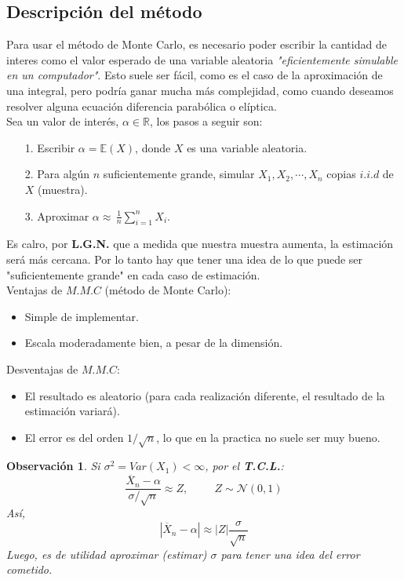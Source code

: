 \documentclass[a4paper]{article}
\numberwithin{equation}{subsection}
\newtheorem{obs}{Observación}
\def\R{\mathbb R}
\def\E{\mathbb E}
\begin{document}
\subsection{Descripción del método}
Para usar el método de Monte Carlo, es necesario poder escribir la cantidad de interes como el valor esperado de una variable aleatoria \textit{"eficientemente simulable en un computador"}. Esto suele ser fácil, como es el caso de la aproximación de una integral, pero podría ganar mucha más complejidad, como cuando deseamos resolver alguna ecuación diferencia parabólica o elíptica.\\ \newline
Sea un valor de interés, $\alpha\in\R$, los pasos a seguir son:
\begin{itemize}
    \item[1.] Escribir $\alpha = \E(X)$, donde $X$ es una variable aleatoria.
    \item[2.] Para algún $n$ suficientemente grande, simular $X_1,X_2,\cdots,X_n$ copias $i.i.d$ de $X$ (muestra).
    \item[3.] Aproximar $\alpha\approx\,\frac{1}{n}\sum_{i=1}^nX_i$.
\end{itemize}
Es calro, por \textbf{L.G.N.} que a medida que nuestra muestra aumenta, la estimación será más cercana. Por lo tanto hay que tener una idea de lo que puede ser "suficientemente grande" en cada caso de estimación.\\
Ventajas de $M.M.C$ (método de Monte Carlo):\\
\begin{itemize}
    \item Simple de implementar.
    \item Escala moderadamente bien, a pesar de la dimensión.
\end{itemize}
Desventajas de $M.M.C$:
\begin{itemize}
    \item El resultado es aleatorio (para cada realización diferente, el resultado de la estimación variará).
    \item El error es del orden $1/\sqrt{n}$, lo que en la practica no suele ser muy bueno.
\end{itemize}
\begin{obs} Si $\sigma^2 = Var(X_1)<\infty$, por el \textbf{T.C.L.}:
\[\frac{\overline{X}_n -\alpha}{\sigma / \sqrt{n}}\approx Z,\hspace{1cm}Z\sim\mathcal{N}(0,1)\]
Así,
\[|\overline{X}_n -\alpha| \approx|Z|\frac{\sigma}{\sqrt{n}}\]
Luego, es de utilidad aproximar (estimar) $\sigma$ para tener una idea del error cometido. 
\end{obs}
\end{document}
